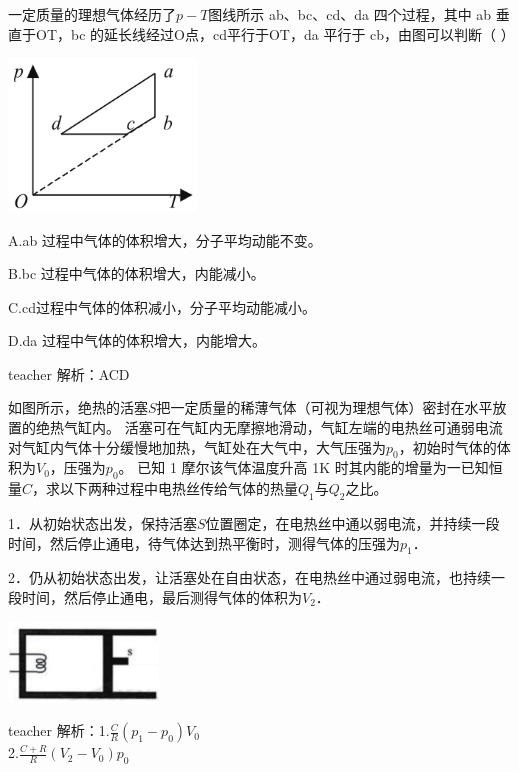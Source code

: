 \begin{example}
	一定质量的理想气体经历了$p-T$图线所示 ab、bc、cd、da 四个过程，其中 ab 垂直于OT，bc 的延长线经过O点，cd平行于OT，da 平行于 cb，由图可以判断（ ）
	
\begin{center}
	\includegraphics[width=5cm]{images/thermal-12.pdf} 
\end{center}
	 
	
	A.ab 过程中气体的体积增大，分子平均动能不变。
	
	 B.bc 过程中气体的体积增大，内能减小。
	 
	  C.cd过程中气体的体积减小，分子平均动能减小。
	  
	   D.da 过程中气体的体积增大，内能增大。

	\begin{taggedblock}{teacher}
		\noindent
		解析：ACD
	\end{taggedblock}
\end{example}

\begin{example}
如图所示，绝热的活塞$ S $把一定质量的稀薄气体（可视为理想气体）密封在水平放置的绝热气缸内。
活塞可在气缸内无摩擦地滑动，气缸左端的电热丝可通弱电流对气缸内气体十分缓慢地加热，气缸处在大气中，大气压强为$p_0$，初始时气体的体积为$V_0$，压强为$p_0$。
已知 1 摩尔该气体温度升高 1K 时其内能的增量为一已知恒量$ C$，求以下两种过程中电热丝传给气体的热量$Q_1$与$Q_2$之比。

1．从初始状态出发，保持活塞$ S $位置圈定，在电热丝中通以弱电流，并持续一段时间，然后停止通电，待气体达到热平衡时，测得气体的压强为$p_1$．
	
	2．仍从初始状态出发，让活塞处在自由状态，在电热丝中通过弱电流，也持续一段时间，然后停止通电，最后测得气体的体积为$V_2$．
	
		\begin{flushright}
			\includegraphics[width = 0.3\textwidth]{images/thermal-6.pdf} 
		\end{flushright}
	\begin{taggedblock}{teacher}
		\noindent
		解析：1.$\frac{C}{R}(p_1-p_0)V_0$
		\\2.$\frac{C+R}{R}(V_2-V_0)p_0$
	\end{taggedblock}
\end{example}


